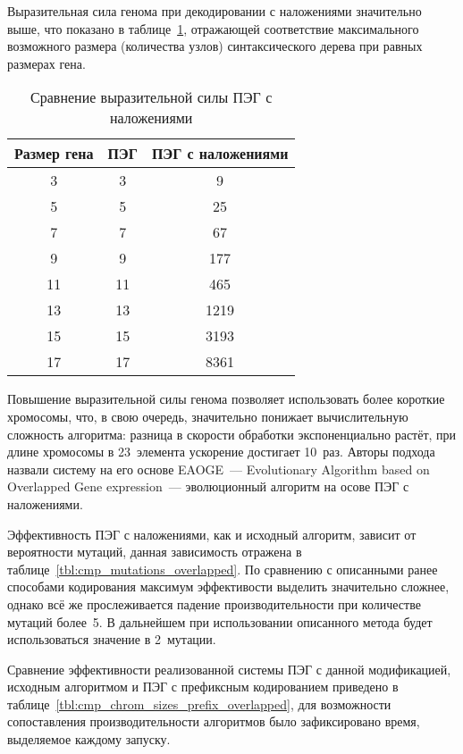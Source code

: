 Выразительная сила генома при декодировании с наложениями значительно выше, что показано в таблице~\ref{tbl:EAOGE_expression_power}, отражающей соответствие максимального возможного размера (количества узлов) синтаксического дерева при равных размерах гена.

\begin{table}[h]
  \caption{Сравнение выразительной силы ПЭГ с наложениями}
  \label{tbl:EAOGE_expression_power}
  \begin{center}
    \begin{tabular}{|c|c|c|}
      \hline
      Размер гена & ПЭГ & ПЭГ с наложениями \\
      \hline
      3 & 3 & 9 \\
      5 & 5 & 25 \\
      7 & 7 & 67 \\
      9 & 9 & 177 \\
      11 & 11 & 465 \\
      13 & 13 & 1219 \\
      15 & 15 & 3193 \\
      17 & 17 & 8361 \\
      \hline
    \end{tabular}
  \end{center}
\end{table}

Повышение выразительной силы генома позволяет использовать более короткие хромосомы, что, в свою очередь, значительно понижает вычислительную сложность алгоритма: разница в скорости обработки экспоненциально растёт, при длине хромосомы в 23~элемента ускорение достигает 10~раз. Авторы подхода назвали систему на его основе EAOGE~--- Evolutionary Algorithm based on Overlapped Gene expression~--- эволюционный алгоритм на осове ПЭГ с наложениями. 

Эффективность ПЭГ с наложениями, как и исходный алгоритм, зависит от вероятности мутаций, данная зависимость отражена в таблице~\ref{tbl:cmp_mutations_overlapped}. По сравнению с описанными ранее способами кодирования максимум эффективости выделить значительно сложнее, однако всё же прослеживается падение производительности при количестве мутаций более~5. В дальнейшем при использовании описанного метода будет использоваться значение в 2~мутации.



Сравнение эффективности реализованной системы ПЭГ с данной модификацией, исходным алгоритмом и ПЭГ с префиксным кодированием приведено в таблице~\ref{tbl:cmp_chrom_sizes_prefix_overlapped}, для возможности сопоставления производительности алгоритмов было зафиксировано время, выделяемое каждому запуску.

